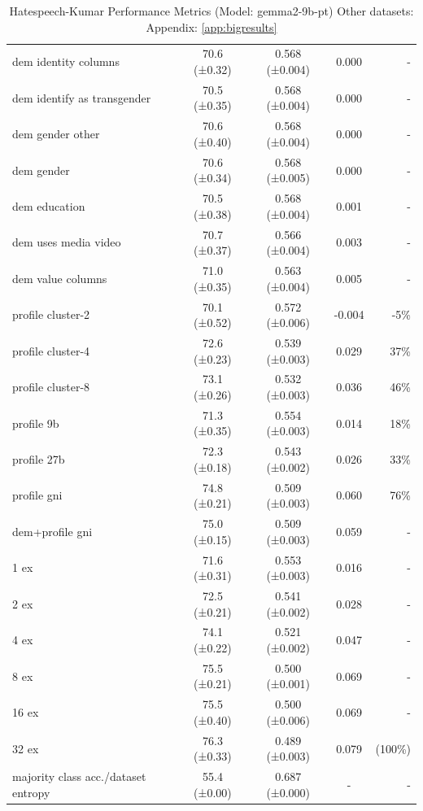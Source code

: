 \documentclass[11pt]{article}
\begin{document}
\begin{table}[h]
\begin{tabular}{|l|c|c|c|r|}
dem identity columns & 70.6 (±0.32) & 0.568 (±0.004) & 0.000 & - \\
dem identify as transgender & 70.5 (±0.35) & 0.568 (±0.004) & 0.000 & - \\
dem gender other & 70.6 (±0.40) & 0.568 (±0.004) & 0.000 & - \\
dem gender & 70.6 (±0.34) & 0.568 (±0.005) & 0.000 & - \\
dem education & 70.5 (±0.38) & 0.568 (±0.004) & 0.001 & - \\
dem uses media video & 70.7 (±0.37) & 0.566 (±0.004) & 0.003 & - \\
dem value columns & 71.0 (±0.35) & 0.563 (±0.004) & 0.005 & - \\
profile cluster-2 & 70.1 (±0.52) & 0.572 (±0.006) & -0.004 & -5\% \\
profile cluster-4 & 72.6 (±0.23) & 0.539 (±0.003) & 0.029 & 37\% \\
profile cluster-8 & 73.1 (±0.26) & 0.532 (±0.003) & 0.036 & 46\% \\
profile 9b & 71.3 (±0.35) & 0.554 (±0.003) & 0.014 & 18\% \\
profile 27b & 72.3 (±0.18) & 0.543 (±0.002) & 0.026 & 33\% \\
profile gni & 74.8 (±0.21) & 0.509 (±0.003) & 0.060 & 76\% \\
dem+profile gni & 75.0 (±0.15) & 0.509 (±0.003) & 0.059 & - \\
1 ex & 71.6 (±0.31) & 0.553 (±0.003) & 0.016 & - \\
2 ex & 72.5 (±0.21) & 0.541 (±0.002) & 0.028 & - \\
4 ex & 74.1 (±0.22) & 0.521 (±0.002) & 0.047 & - \\
8 ex & 75.5 (±0.21) & 0.500 (±0.001) & 0.069 & - \\
16 ex & 75.5 (±0.40) & 0.500 (±0.006) & 0.069 & - \\
32 ex & 76.3 (±0.33) & 0.489 (±0.003) & 0.079 & (100\%) \\
majority class acc./dataset entropy & 55.4 (±0.00) & 0.687 (±0.000) & - & - \\
\hline
\end{tabular}
\caption{Hatespeech-Kumar Performance Metrics (Model: gemma2-9b-pt) Other datasets: Appendix: \ref{app:bigresults}}
\label{tab:performance_hatespeech-kumar}
\end{table}
\end{document}
